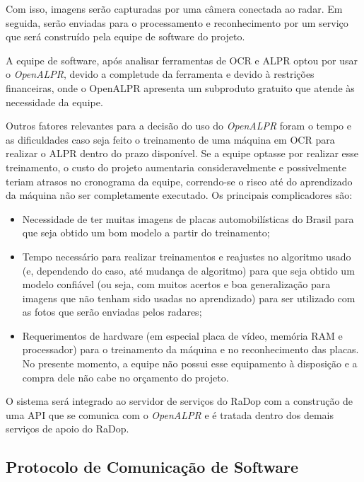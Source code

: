Com isso, imagens serão capturadas por uma câmera conectada ao radar. Em seguida, serão enviadas para o processamento e reconhecimento por um serviço que será construído pela equipe de software do projeto.

A equipe de software, após analisar ferramentas de OCR e ALPR optou por usar o \textit{OpenALPR}, devido a completude da ferramenta e devido à restrições financeiras, onde o OpenALPR apresenta um subproduto gratuito que atende às necessidade da equipe.

Outros fatores relevantes para a decisão do uso do \textit{OpenALPR} foram o tempo e as dificuldades caso seja feito o treinamento de uma máquina em OCR para realizar o ALPR dentro do prazo disponível. Se a equipe optasse por realizar esse treinamento, o custo do projeto aumentaria consideravelmente e possivelmente teriam atrasos no cronograma da equipe, correndo-se o risco até do aprendizado da máquina não ser completamente executado. Os principais complicadores são:

\begin{itemize}
    \item Necessidade de ter muitas imagens de placas automobilísticas do Brasil para que seja obtido um bom modelo a partir do treinamento;
    \item Tempo necessário para realizar treinamentos e reajustes no algoritmo usado (e, dependendo do caso, até mudança de algoritmo) para que seja obtido um modelo confiável (ou seja, com muitos acertos e boa generalização para imagens que não tenham sido usadas no aprendizado) para ser utilizado com as fotos que serão enviadas pelos radares;
    \item Requerimentos de hardware (em especial placa de vídeo, memória RAM e processador) para o treinamento da máquina e no reconhecimento das placas. No presente momento, a equipe não possui esse equipamento à disposição e a compra dele não cabe no orçamento do projeto.
\end{itemize}

O sistema será integrado ao servidor de serviços do RaDop com a construção de uma API que se comunica com o \textit{OpenALPR} e é tratada dentro dos demais serviços de apoio do RaDop.

\subsection{Protocolo de Comunicação de Software}

